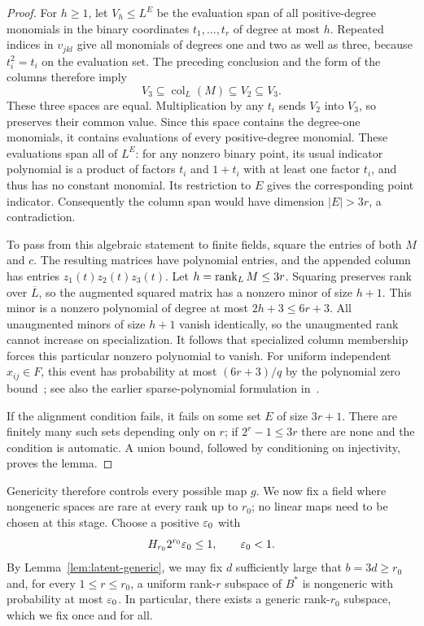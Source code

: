 \begin{proof}
For $h\ge1$, let $V_h\le L^E$ be the evaluation span of all
positive-degree monomials in the binary coordinates $t_1,\ldots,t_r$
of degree at most $h$.  Repeated indices in $v_{jkl}$ give all monomials
of degrees one and two as well as three, because $t_i^2=t_i$ on the
evaluation set.  The preceding conclusion and the form of the columns
therefore imply
\[
 V_3\subseteq\operatorname{col}_L(M)\subseteq V_2\subseteq V_3.
\]
These three spaces are equal.  Multiplication by any $t_i$ sends $V_2$
into $V_3$, so preserves their common value.  Since this space contains
the degree-one monomials, it contains evaluations of every positive-degree
monomial.  These evaluations span all of $L^E$: for any nonzero binary
point, its usual indicator polynomial is a product of factors $t_i$ and
$1+t_i$ with at least one factor $t_i$, and thus has no constant monomial.
Its restriction to $E$ gives the corresponding point indicator.
Consequently the column span would have dimension $|E|>3r$, a
contradiction.

To pass from this algebraic statement to finite fields, square the entries
of both $M$ and $c$.  The resulting matrices have polynomial entries,
and the appended column has entries $z_1(t)z_2(t)z_3(t)$.
Let $h=\operatorname{rank}_L M\le3r$.  Squaring preserves rank over $\overline L$,
so the augmented squared matrix has a nonzero minor of size $h+1$.
This minor is a nonzero polynomial of degree at most $2h+3\le6r+3$.
All unaugmented minors of size $h+1$ vanish identically, so the
unaugmented rank cannot increase on specialization.  It follows that
specialized column membership forces this particular nonzero polynomial
to vanish.  For uniform independent $x_{ij}\in F$, this event has
probability at most $(6r+3)/q$ by the polynomial zero bound~\cite[Corollary~1]{Schwartz80};
see also the earlier sparse-polynomial formulation in~\cite[Section~3.1]{Zippel79}.

If the alignment condition fails, it fails on some set $E$ of size
$3r+1$.  There are finitely many such sets depending only on $r$; if
$2^r-1\le3r$ there are none and the condition is automatic.  A union
bound, followed by conditioning on injectivity, proves the lemma.
\end{proof}

Genericity therefore controls every possible map $g$.  We now fix a
field where nongeneric spaces are rare at every rank up to $r_0$; no linear
maps need to be chosen at this stage.  Choose a positive $\varepsilon_0$ with
\begin{equation}\label{eq:latent-generic-error}
 H_{r_0}2^{r_0}\varepsilon_0\le1,
 \qquad \varepsilon_0<1.
\end{equation}
By Lemma~\ref{lem:latent-generic}, we may fix $d$ sufficiently large that
$b=3d\ge r_0$ and, for every $1\le r\le r_0$, a uniform rank-$r$
subspace of $B^*$ is nongeneric with probability at most $\varepsilon_0$.
In particular, there exists a generic rank-$r_0$ subspace, which we fix
once and for all.

